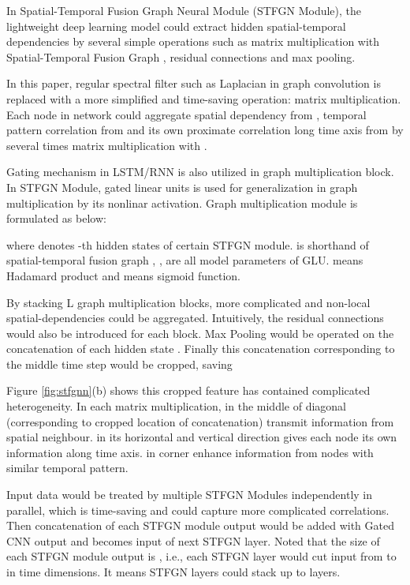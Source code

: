 \documentclass[letterpaper]{article} \usepackage{aaai21}  \usepackage{times}  \usepackage{helvet} \usepackage{courier}  \usepackage[hyphens]{url}  \usepackage{graphicx} \urlstyle{rm} \def\UrlFont{\rm}  \usepackage{natbib}  \usepackage{caption} \frenchspacing  \setlength{\pdfpagewidth}{8.5in}  \setlength{\pdfpageheight}{11in}  \usepackage{multirow}
\begin{document}
In Spatial-Temporal Fusion Graph Neural Module (STFGN Module), the lightweight deep learning model could extract hidden spatial-temporal dependencies by several simple operations such as matrix multiplication with Spatial-Temporal Fusion Graph , residual connections and max pooling.

In this paper, regular spectral filter such as Laplacian in graph convolution is replaced with a more simplified and time-saving operation: matrix multiplication. Each node in network could aggregate spatial dependency from , temporal pattern correlation from  and its own proximate correlation long time axis from  by several times matrix multiplication with . 

Gating mechanism in LSTM/RNN is also utilized in graph multiplication block. In STFGN Module, gated linear units is used for generalization in graph multiplication by its nonlinar activation. Graph multiplication module is formulated as below:


where  denotes -th hidden states of certain STFGN module.  is shorthand of spatial-temporal fusion graph , ,  are all model parameters of GLU.  means Hadamard product and  means sigmoid function.

By stacking L graph multiplication blocks, more complicated and non-local spatial-dependencies could be aggregated. Intuitively, the residual connections \cite{he2016deep} would also be introduced for each block. Max Pooling would be operated on the concatenation of each hidden state . Finally this concatenation corresponding to the middle time step would be cropped, saving  

Figure \ref{fig:stfgnn}(b) shows this cropped feature has contained complicated heterogeneity. In each matrix multiplication,  in the middle of diagonal (corresponding to cropped location of concatenation) transmit information from spatial neighbour.  in its horizontal and vertical direction gives each node its own information along time axis.  in corner enhance information from nodes with similar temporal pattern.

Input data would be treated by multiple STFGN Modules independently in parallel, which is time-saving and could capture more complicated correlations. Then concatenation of each STFGN module output would be added with Gated CNN output and becomes input of next STFGN layer. Noted that the size of each STFGN module output is , i.e., each STFGN layer would cut input from  to  in time dimensions. It means STFGN layers could stack up to  layers.
\end{document}
